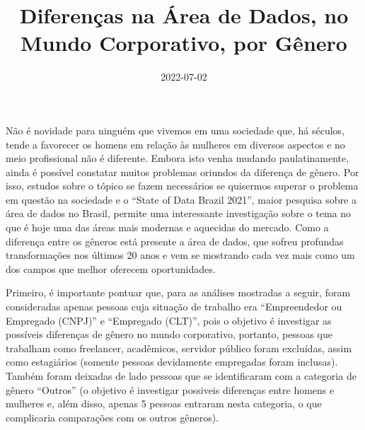 \documentclass[
]{article}
\title{Diferenças na Área de Dados, no Mundo Corporativo, por Gênero}
\author{}
\date{\vspace{-2.5em}2022-07-02}
\begin{document}
\maketitle

Não é novidade para ninguém que vivemos em uma sociedade que, há
séculos, tende a favorecer os homens em relação às mulheres em diversos
aspectos e no meio profissional não é diferente. Embora isto venha
mudando paulatinamente, ainda é possível constatar muitos problemas
oriundos da diferença de gênero. Por isso, estudos sobre o tópico se
fazem necessários se quisermos superar o problema em questão na
sociedade e o ``State of Data Brazil 2021'', maior pesquisa sobre a área
de dados no Brasil, permite uma interessante investigação sobre o tema
no que é hoje uma das áreas mais modernas e aquecidas do mercado. Como a
diferença entre os gêneros está presente a área de dados, que sofreu
profundas transformações nos últimos 20 anos e vem se mostrando cada vez
mais como um dos campos que melhor oferecem oportunidades.

Primeiro, é importante pontuar que, para as análises mostradas a seguir,
foram consideradas apenas pessoas cuja situação de trabalho era
``Empreendedor ou Empregado (CNPJ)'' e ``Empregado (CLT)'', pois o
objetivo é investigar as possíveis diferenças de gênero no mundo
corporativo, portanto, pessoas que trabalham como freelancer,
acadêmicos, servidor público foram excluídas, assim como estagiários
(somente pessoas devidamente empregadas foram inclusas). Também foram
deixadas de lado pessoas que se identificaram com a categoria de gênero
``Outros'' (o objetivo é investigar possiveis diferenças entre homens e
mulheres e, além disso, apenas 5 pessoas entraram nesta categoria, o que
complicaria comparações com os outros gêneros).
\end{document}
